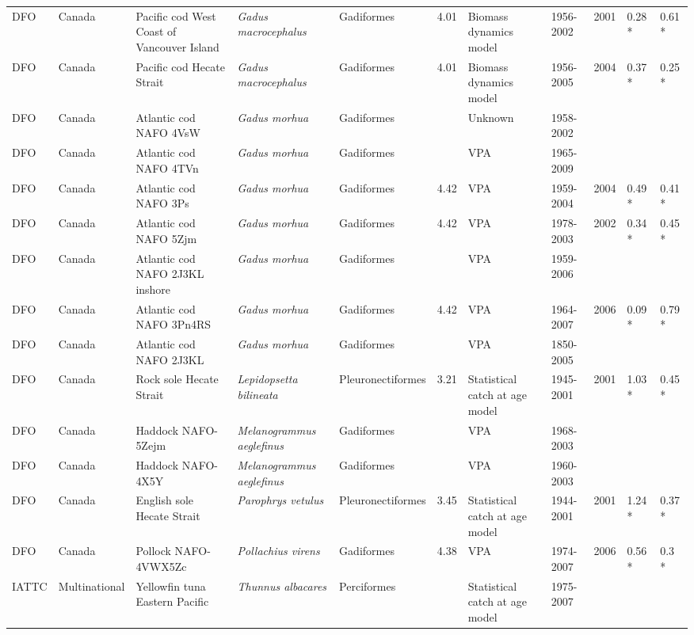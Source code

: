 \begin{longtable}{p{1.5cm}p{1.5cm}p{3cm}p{3cm}p{2.5cm}p{0.9cm}p{1.4cm}p{0.9cm}p{0.9cm}p{0.9cm}p{1cm}}
  DFO & Canada & Pacific cod West Coast of Vancouver Island & \textit{Gadus macrocephalus} & Gadiformes & 4.01 & Biomass dynamics model & 1956-2002 & 2001 & 0.28 * & 0.61 * \\ 
  DFO & Canada & Pacific cod Hecate Strait & \textit{Gadus macrocephalus} & Gadiformes & 4.01 & Biomass dynamics model & 1956-2005 & 2004 & 0.37 * & 0.25 * \\ 
  DFO & Canada & Atlantic cod NAFO 4VsW & \textit{Gadus morhua} & Gadiformes &  & Unknown & 1958-2002 &  &  &  \\ 
  DFO & Canada & Atlantic cod NAFO 4TVn & \textit{Gadus morhua} & Gadiformes &  & VPA & 1965-2009 &  &  &  \\ 
  DFO & Canada & Atlantic cod NAFO 3Ps & \textit{Gadus morhua} & Gadiformes & 4.42 & VPA & 1959-2004 & 2004 & 0.49 * & 0.41 * \\ 
  DFO & Canada & Atlantic cod NAFO 5Zjm & \textit{Gadus morhua} & Gadiformes & 4.42 & VPA & 1978-2003 & 2002 & 0.34 * & 0.45 * \\ 
  DFO & Canada & Atlantic cod NAFO 2J3KL inshore & \textit{Gadus morhua} & Gadiformes &  & VPA & 1959-2006 &  &  &  \\ 
  DFO & Canada & Atlantic cod NAFO 3Pn4RS & \textit{Gadus morhua} & Gadiformes & 4.42 & VPA & 1964-2007 & 2006 & 0.09 * & 0.79 * \\ 
  DFO & Canada & Atlantic cod NAFO 2J3KL & \textit{Gadus morhua} & Gadiformes &  & VPA & 1850-2005 &  &  &  \\ 
  DFO & Canada & Rock sole Hecate Strait & \textit{Lepidopsetta bilineata} & Pleuronectiformes & 3.21 & Statistical catch at age model & 1945-2001 & 2001 & 1.03 * & 0.45 * \\ 
  DFO & Canada & Haddock NAFO-5Zejm & \textit{Melanogrammus aeglefinus} & Gadiformes &  & VPA & 1968-2003 &  &  &  \\ 
  DFO & Canada & Haddock NAFO-4X5Y & \textit{Melanogrammus aeglefinus} & Gadiformes &  & VPA & 1960-2003 &  &  &  \\ 
  DFO & Canada & English sole Hecate Strait & \textit{Parophrys vetulus} & Pleuronectiformes & 3.45 & Statistical catch at age model & 1944-2001 & 2001 & 1.24 * & 0.37 * \\ 
  DFO & Canada & Pollock NAFO-4VWX5Zc & \textit{Pollachius virens} & Gadiformes & 4.38 & VPA & 1974-2007 & 2006 & 0.56 * & 0.3 * \\ 
  IATTC & Multinational & Yellowfin tuna Eastern Pacific & \textit{Thunnus albacares} & Perciformes &  & Statistical catch at age model & 1975-2007 &  &  &  \\ 

\end{longtable}
